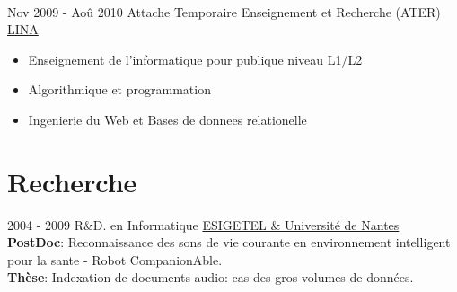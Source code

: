 \documentclass[letterpaper]{twentysecondcv} %
\begin{document}
\begin{twenty}
	   \\
		\twentyitem
		{Nov 2009 -}
		{Aoû 2010}
		{Attache Temporaire Enseignement et Recherche (ATER)}
		{\href{http://www.lina.univ-nantes.fr/}{LINA}}
		{}
		{
		\begin{itemize}
		\item Enseignement de l'informatique pour publique niveau L1/L2
		\item Algorithmique et programmation
		\item Ingenierie du Web et Bases de donnees relationelle
		\end{itemize}
		}
\end{twenty}

\section{Recherche}
\begin{twenty}
	\twentyitem
    	{2004 - 2009}
		{}
        {R\&D. en Informatique}
        {\href{https://www.univ-nantes.fr/}{ESIGETEL \& Université de Nantes}}
        {}
	       {
	        \textbf{PostDoc}: Reconnaissance des sons de vie courante en environnement intelligent pour la sante - Robot CompanionAble. \\
	       	\textbf{Thèse}: Indexation de documents audio: cas des gros volumes de données.
	        {
			}
	       }
  
\end{twenty}

\end{document}
